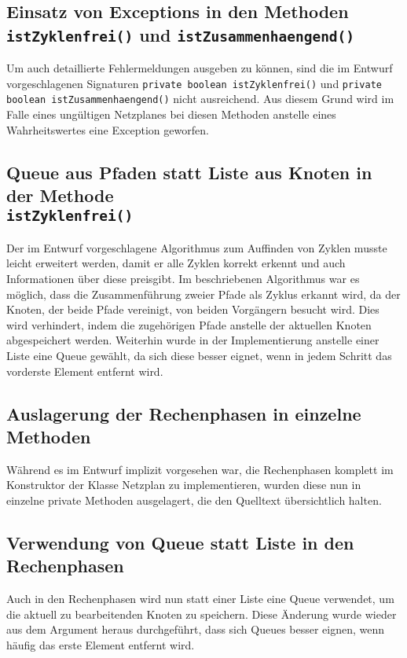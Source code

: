 \subsection{Einsatz von Exceptions in den Methoden
  \texttt{istZyklenfrei()} und \texttt{istZusammenhaengend()}}

Um auch detaillierte Fehlermeldungen ausgeben zu k\"onnen, sind die im
Entwurf vorgeschlagenen Signaturen \texttt{private boolean istZyklenfrei()}
und \texttt{private boolean istZusammenhaengend()} nicht
ausreichend. Aus diesem Grund wird im Falle eines ung\"ultigen
Netzplanes bei diesen Methoden anstelle eines Wahrheitswertes eine
Exception geworfen.

\subsection{Queue aus Pfaden statt Liste aus Knoten in der Methode\\
  \texttt{istZyklenfrei()}}

Der im Entwurf vorgeschlagene Algorithmus zum Auffinden von Zyklen
musste leicht erweitert werden, damit er alle Zyklen korrekt erkennt
und auch Informationen \"uber diese preisgibt. Im beschriebenen
Algorithmus war es m\"oglich, dass die Zusammenf\"uhrung zweier Pfade
als Zyklus erkannt wird, da der Knoten, der beide Pfade vereinigt, von
beiden Vorg\"angern besucht wird. Dies wird verhindert, indem die
zugeh\"origen Pfade anstelle der aktuellen Knoten abgespeichert
werden. Weiterhin wurde in der Implementierung anstelle einer Liste
eine Queue gew\"ahlt, da sich diese besser eignet, wenn in jedem
Schritt das vorderste Element entfernt wird.

\subsection{Auslagerung der Rechenphasen in einzelne Methoden}

W\"ahrend es im Entwurf implizit vorgesehen war, die Rechenphasen
komplett im Konstruktor der Klasse Netzplan zu implementieren, wurden
diese nun in einzelne private Methoden ausgelagert, die den Quelltext
\"ubersichtlich halten.

\subsection{Verwendung von Queue statt Liste in den Rechenphasen}

Auch in den Rechenphasen wird nun statt einer Liste eine Queue
verwendet, um die aktuell zu bearbeitenden Knoten zu speichern. Diese
\"Anderung wurde wieder aus dem Argument heraus durchgef\"uhrt, dass
sich Queues besser eignen, wenn h\"aufig das erste Element entfernt
wird.

